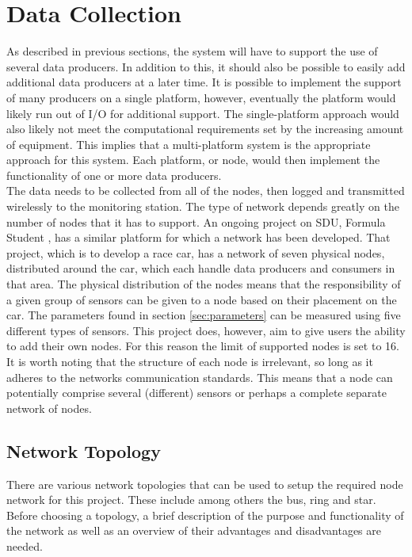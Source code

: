 
\section{Data Collection}
\label{sec:data_collection}
As described in previous sections, the system will have to support the use of several data producers.
In addition to this, it should also be possible to easily add additional data producers at a later time.
It is possible to implement the support of many producers on a single platform, however, eventually the platform would likely run out of I/O for additional support.
The single-platform approach would also likely not meet the computational requirements set by the increasing amount of equipment.
This implies that a multi-platform system is the appropriate approach for this system.
Each platform, or node, would then implement the functionality of one or more data producers.\\

The data needs to be collected from all of the nodes, then logged and transmitted wirelessly to the monitoring station.
The type of network depends greatly on the number of nodes that it has to support.
An ongoing project on SDU, Formula Student \cite{formulastudent}, has a similar platform for which a network has been developed.
That project, which is to develop a race car, has a network of seven physical nodes, distributed around the car, which each handle data producers and consumers in that area.
The physical distribution of the nodes means that the responsibility of a given group of sensors can be given to a node based on their placement on the car.
The parameters found in section \ref{sec:parameters} can be measured using five different types of sensors.
This project does, however, aim to give users the ability to add their own nodes.
For this reason the limit of supported nodes is set to 16.
It is worth noting that the structure of each node is irrelevant, so long as it adheres to the networks communication standards.
This means that a node can potentially comprise several (different) sensors or perhaps a complete separate network of nodes.

\subsection{Network Topology}

There are various network topologies that can be used to setup the required node network for this project.
These include among others the bus, ring and star. 
Before choosing a topology, a brief description of the purpose and functionality of the network as well as an overview of their advantages and disadvantages are needed.\\ 

